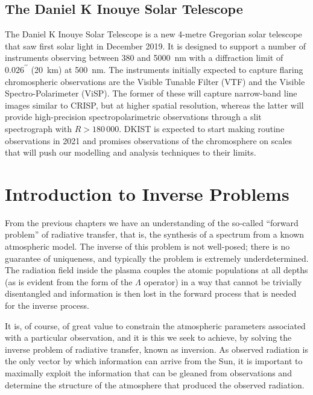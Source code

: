 \subsection{The Daniel K Inouye Solar Telescope}

The Daniel K Inouye Solar Telescope \citep[DKIST, ][]{Rimmele2020} is a new 4-metre Gregorian solar telescope that saw first solar light in December 2019.
It is designed to support a number of instruments observing between 380 and \SI{5000}{\nano\metre} with a diffraction limit of $0.026^{\prime\prime}$ (\SI{20}{\kilo\metre}) at \SI{500}{\nano\metre}.
The instruments initially expected to capture flaring chromospheric observations are the Visible Tunable Filter (VTF) and the Visible Spectro-Polarimeter (ViSP).
The former of these will capture narrow-band line images similar to CRISP, but at higher spatial resolution, whereas the latter will provide high-precision spectropolarimetric observations through a slit spectrograph with $R>180\,000$.
DKIST is expected to start making routine observations in 2021 and promises observations of the chromosphere on scales that will push our modelling and analysis techniques to their limits.

\section{Introduction to Inverse Problems}\label{Sec:InverseProblems}

From the previous chapters we have an understanding of the so-called ``forward problem'' of radiative transfer, that is, the synthesis of a spectrum from a known atmospheric model.
The inverse of this problem is not well-posed; there is no guarantee of uniqueness, and typically the problem is extremely underdetermined.
The radiation field inside the plasma couples the atomic populations at all depths (as is evident from the form of the $\Lambda$ operator) in a way that cannot be trivially disentangled and information is then lost in the forward process that is needed for the inverse process.

It is, of course, of great value to constrain the atmospheric parameters associated with a particular observation, and it is this we seek to achieve, by solving the inverse problem of radiative transfer, known as inversion.
As observed radiation is the only vector by which information can arrive from the Sun, it is important to maximally exploit the information that can be gleaned from observations and determine the structure of the atmosphere that produced the observed radiation.

